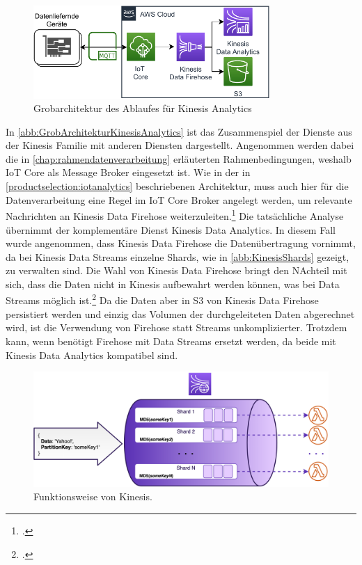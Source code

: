 \begin{figure}[H]
\centering
\includegraphics[width=0.8\textwidth]{graphics/Kinesis-Analytics-general.pdf}
\caption{Grobarchitektur des Ablaufes für Kinesis Analytics}
\label{abb:GrobArchitekturKinesisAnalytics}
\end{figure}
In \autoref{abb:GrobArchitekturKinesisAnalytics} ist das Zusammenspiel der Dienste aus der Kinesis Familie mit anderen Diensten dargestellt. Angenommen werden dabei die in \autoref{chap:rahmendatenverarbeitung} erläuterten Rahmenbedingungen, weshalb \ac{IoT} Core als Message Broker eingesetzt ist. Wie in der in \autoref{productselection:iotanalytics} beschriebenen Architektur, muss auch hier für die Datenverarbeitung eine Regel im \ac{IoT} Core Broker angelegt werden, um relevante Nachrichten an Kinesis Data Firehose weiterzuleiten.\footcite[Vgl.][]{AmazonWebServicesInc..o.J.} Die tatsächliche Analyse übernimmt der komplementäre Dienst Kinesis Data Analytics. 
In diesem Fall wurde angenommen, dass Kinesis Data Firehose die Datenübertragung vornimmt, da bei Kinesis Data Streams einzelne Shards, wie in \autoref{abb:KinesisShards} gezeigt, zu verwalten sind. Die Wahl von Kinesis Data Firehose bringt den NAchteil mit sich, dass die Daten nicht in Kinesis aufbewahrt werden können, was bei Data Streams möglich ist.\footcite[Vgl.][]{AmazonWebServicesInc..o.J.bh} Da die Daten aber in \ac{S3} von Kinesis Data Firehose persistiert werden und einzig das Volumen der durchgeleiteten Daten abgerechnet wird, ist die Verwendung von Firehose statt Streams unkomplizierter. Trotzdem kann, wenn benötigt Firehose mit Data Streams ersetzt werden, da beide mit Kinesis Data Analytics kompatibel sind.

\begin{figure}[H]
\centering
\includegraphics[width=\textwidth]{graphics/kinesis-inner-workings.png}
\caption[Funktionsweise von Kinesis]{Funktionsweise von Kinesis.\footnotemark}
\label{abb:KinesisShards}
\end{figure}

